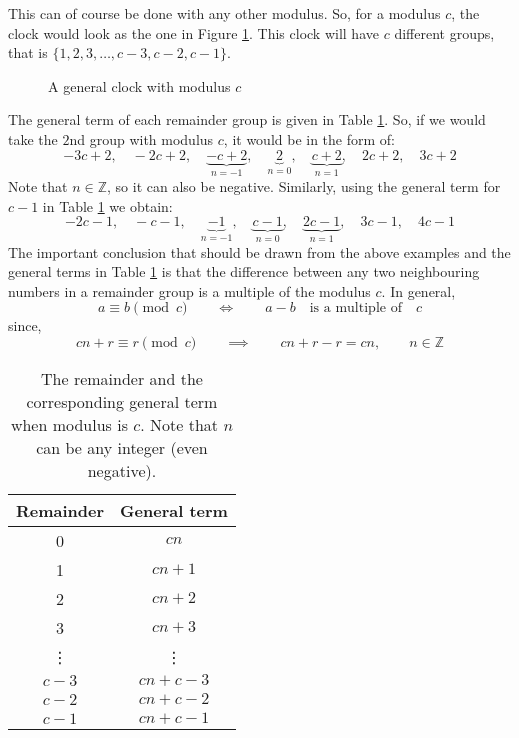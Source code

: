 This can of course be done with any other modulus. So, for a modulus $c$, the clock would look as the one in Figure \ref{C-clock}. This clock will have $c$ different groups, that is $\{ 1,2,3, \dots, c-3,c-2, c-1 \} $. %
\begin{figure}[h]
\begin{center}
\end{center}
\caption{A general clock with modulus $c$}
\label{C-clock}
\end{figure}
The general term of each remainder group is given in Table \ref{TableModC}. So, if we would take the $2$nd group with modulus $c$, it would be in the form of:
\begin{equation*}
-3c+2,\quad-2c+2,\quad \underbrace{-c+2}_{n=-1},\quad \underbrace{2}_{n=0}, \quad \underbrace{c+2}_{n=1}, \quad 2c+2, \quad 3c+2
\end{equation*}
Note that $n \in \mathbb{Z}$, so it can also be negative. Similarly, using the general term for $c-1$ in Table \ref{TableModC} we obtain:
\begin{equation*}
-2c-1, \quad -c-1, \quad \underbrace{ -1}_{n=-1}, \quad \underbrace{c-1}_{n=0}, \quad \underbrace{2c-1}_{n=1}, \quad 3c-1, \quad 4c-1
\end{equation*}
The important conclusion that should be drawn from the above examples and the general terms in Table \ref{TableModC} is that the difference between  any two neighbouring numbers in a remainder group is a multiple of the modulus $c$. In general, 
\begin{equation}
a \equiv b \pmod c \qquad \iff \qquad a-b \quad\text{is a multiple of} \quad c
\end{equation}
since,
\begin{equation*}
cn+r \equiv r \pmod c \qquad \implies \qquad cn+r-r = cn , \qquad n \in \mathbb{Z} 
\end{equation*}

\begin{table} [h]
\begin{center}
\begin{tabular}{|c|c|}
\hline
Remainder & General term \\
\hline
0 & $cn$ \\
1 & $cn+1$ \\
2 & $cn+2$ \\
3 & $cn+3$ \\
\vdots & \vdots \\
$c-3$ & $cn+c-3$ \\
$c-2$ & $cn+c-2$ \\
$c-1$ & $cn+ c-1$ \\
\hline
\end{tabular}
\end{center}
\caption{The remainder and the corresponding general term when modulus is $c$. Note that $n$ can be any integer (even negative).}
\label{TableModC}
\end{table}



